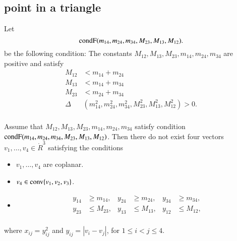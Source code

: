 \subsection{point in a triangle}

\begin{definition}[$\condface$]
Let
	$$
	{\operatorname{condF}}(m_{14},m_{24},m_{34},M_{23},M_{13},M_{12}).
	$$
be the following condition:
The constants $M_{12},M_{13},M_{23},m_{14},m_{24},m_{34}$ are positive and
satisfy 
	$$
	\begin{array}{rll}
		M_{12} &< m_{14} + m_{24}\\
		M_{13} &< m_{14} + m_{34}\\
		M_{23} &< m_{24} + m_{34}\\
		\Delta&(m_{14}^2,m_{24}^2,m_{34}^2,M_{23}^2,M_{13}^2,M_{12}^2) > 0.\\
	\end{array}
	$$
\end{definition}

\begin{lemma} 
Assume that $M_{12},M_{13},M_{23},m_{14},m_{24},m_{34}$ satisfy
condition ${\operatorname{condF}}(m_{14},m_{24},m_{34},M_{23},M_{13},M_{12})$.
Then there do not exist four vectors
$v_1,\ldots,v_4\in\ring{R}^3$ satisfying the conditions
	\begin{itemize}
		\item $v_1,\ldots,v_4$ are coplanar.
		\item $v_4\in{\operatorname{conv}}\{v_1,v_2,v_3\}$.
		\item $$
	\begin{array}{rlrlrl}
		y_{14} &\ge m_{14}, &y_{24} &\ge m_{24}, &y_{34}&\ge m_{34},\\
		y_{23} &\le  M_{23}, &y_{13} & \le M_{13}, &y_{12}&\le M_{12},\\
	\end{array}
	$$
	\end{itemize}
where
$x_{ij}=y_{ij}^2$ and $y_{ij}=|v_i-v_j|$,
for $1\le i < j \le 4$.  
\end{lemma}



